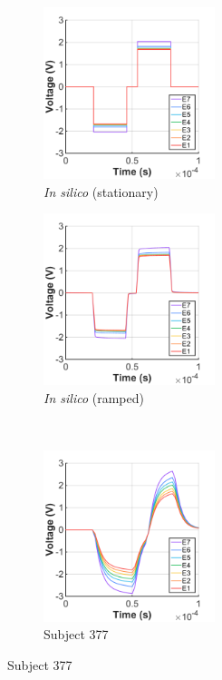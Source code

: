 \begin{figure}
    \centering
    \begin{subfigure}[t]{0.4\textwidth}
        \centering
        \includegraphics[height=5cm]{Simulations/TimeDep/Vt-term8-hemi_gnd-VD_stat}
        \caption{\textit{In silico} (stationary)}
        \label{fig:td_valid_stat}
    \end{subfigure}%
    \begin{subfigure}[t]{0.4\textwidth}
        \centering
        \includegraphics[height=5cm]{Simulations/TimeDep/Vt-term8-hemi_gnd-VD_all}
        \caption{\textit{In silico} (ramped)}
        \label{fig:td_valid_timedep}
    \end{subfigure}\\%
    \vspace{1em}%
    \begin{subfigure}[t]{0.4\textwidth}
        \centering
        \includegraphics[height=5cm]{Simulations/TimeDep/shefin_data-12_377}
        \caption{Subject 377}
        \label{fig:td_valid_shefin_377}
    \end{subfigure}%

\end{figure}
